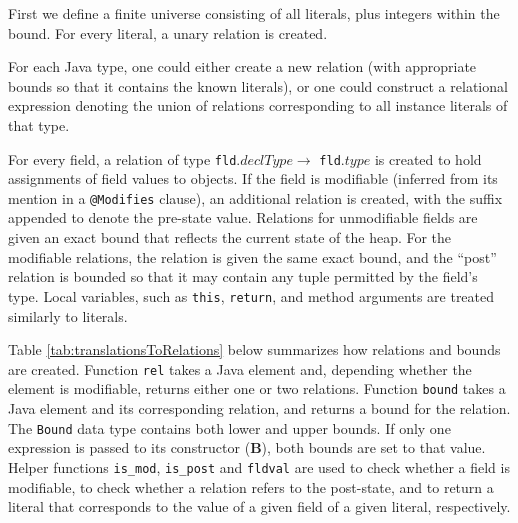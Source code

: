 \documentclass[11pt,twoside,a4paper]{book}
\begin{document}
First we define a finite universe consisting of all literals, plus integers within the
bound. For every literal, a unary relation is created.

For each Java type, one could either create a new relation (with appropriate
bounds so that it contains the known literals), or one could construct a relational
expression denoting the union of relations corresponding to all instance literals of that
type.


For every field, a relation of type
\verb|fld|$.declType \rightarrow$ \verb|fld|$.type$ is created to hold
assignments of field values to objects. If the field is modifiable (inferred
from its mention in a \verb|@Modifies| clause), an additional relation is
created, with the suffix  appended to denote the pre-state value.
Relations for unmodifiable fields are given an exact bound that reflects the
current state of the heap. For the modifiable relations, the  relation
is given the same exact bound, and the “post” relation is bounded so that it may
contain any tuple permitted by the field's type. Local variables, such as
\verb|this|, \verb|return|, and method arguments are treated similarly to
literals.

\newpage

Table \ref{tab:translationsToRelations} below summarizes how relations and
bounds are created. Function \verb|rel| takes a Java element and, depending
whether the element is modifiable, returns either one or two relations. Function
\verb|bound| takes a Java element and its corresponding relation, and returns a
bound for the relation. The \verb|Bound| data type contains both lower and upper
bounds. If only one expression is passed to its constructor (\textbf{B}), both
bounds are set to that value. Helper functions \verb|is_mod|, \verb|is_post|
and \verb|fldval| are used to check whether a field is modifiable, to check
whether a relation refers to the post-state, and to return a literal that
corresponds to the value of a given field of a given literal, respectively.
\end{document}
